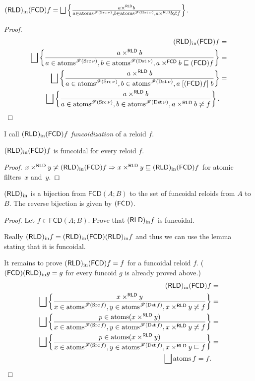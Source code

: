\begin{prop}
$\torldin\tofcd f=\bigsqcup\setcond{a\times^{\mathsf{RLD}}b}{a\in\atoms^{\mathscr{F}(\Src\nu)},b\in\atoms^{\mathscr{F}(\Dst\nu)},a\times^{\mathsf{RLD}}b\nasymp f}$.\end{prop}
\begin{proof}
~
\begin{align*}
\torldin\tofcd f & =\\
\bigsqcup\setcond{a\times^{\mathsf{RLD}}b}{a\in\atoms^{\mathscr{F}(\Src\nu)},b\in\atoms^{\mathscr{F}(\Dst\nu)},a\times^{\mathsf{FCD}}b\sqsubseteq\tofcd f} & =\\
\bigsqcup\setcond{a\times^{\mathsf{RLD}}b}{a\in\atoms^{\mathscr{F}(\Src\nu)},b\in\atoms^{\mathscr{F}(\Dst\nu)},a\suprel{\tofcd f}b} & =\\
\bigsqcup\setcond{a\times^{\mathsf{RLD}}b}{a\in\atoms^{\mathscr{F}(\Src\nu)},b\in\atoms^{\mathscr{F}(\Dst\nu)},a\times^{\mathsf{RLD}}b\nasymp f}.
\end{align*}
\end{proof}
\begin{defn}
I call $(\mathsf{RLD})_{\mathrm{in}}(\mathsf{FCD}) f$ \emph{funcoidization} of a reloid $f$.\end{defn}
\begin{lem}
$(\mathsf{RLD})_{\mathrm{in}}(\mathsf{FCD}) f$ is funcoidal for every reloid $f$.\end{lem}
\begin{proof}
$x\times^{\mathsf{RLD}}y\not\asymp(\mathsf{RLD})_{\mathrm{in}}(\mathsf{FCD}) f\Rightarrow x\times^{\mathsf{RLD}}y\sqsubseteq(\mathsf{RLD})_{\mathrm{in}}(\mathsf{FCD}) f$
for atomic filters~$x$ and~$y$.\end{proof}
\begin{thm}\label{fcdal-bij}
$(\mathsf{RLD})_{\mathrm{in}}$ is a bijection from $\mathsf{FCD}(A;B)$ to the set of
funcoidal reloids from $A$ to $B$. The reverse bijection is given by $(\mathsf{FCD})$.\end{thm}
\begin{proof}
Let $f\in\mathsf{FCD}(A;B)$. Prove that $(\mathsf{RLD})_{\mathrm{in}} f$ is funcoidal.

Really $(\mathsf{RLD})_{\mathrm{in}} f=(\mathsf{RLD})_{\mathrm{in}}(\mathsf{FCD})(\mathsf{RLD})_{\mathrm{in}} f$ and thus we can use
the lemma stating that it is funcoidal.

It remains to prove $(\mathsf{RLD})_{\mathrm{in}}(\mathsf{FCD}) f=f$ for a funcoidal reloid $f$.
($(\mathsf{FCD})(\mathsf{RLD})_{\mathrm{in}} g=g$ for every funcoid $g$ is already proved above.)
\begin{align*}
\torldin\tofcd f & =\\
\bigsqcup\setcond{x\times^{\mathsf{RLD}}y}{x\in\atoms^{\mathscr{F}(\Src f)},y\in\atoms^{\mathscr{F}(\Dst f)},x\times^{\mathsf{RLD}}y\nasymp f} & =\\
\bigsqcup\setcond{p\in\atoms(x\times^{\mathsf{RLD}}y)}{x\in\atoms^{\mathscr{F}(\Src f)},y\in\atoms^{\mathscr{F}(\Dst f)},x\times^{\mathsf{RLD}}y\nasymp f} & =\\
\bigsqcup\setcond{p\in\atoms(x\times^{\mathsf{RLD}}y)}{x\in\atoms^{\mathscr{F}(\Src f)},y\in\atoms^{\mathscr{F}(\Dst f)},x\times^{\mathsf{RLD}}y\sqsubseteq f} & =\\
\bigsqcup\atoms f=f.
\end{align*}
\end{proof}
